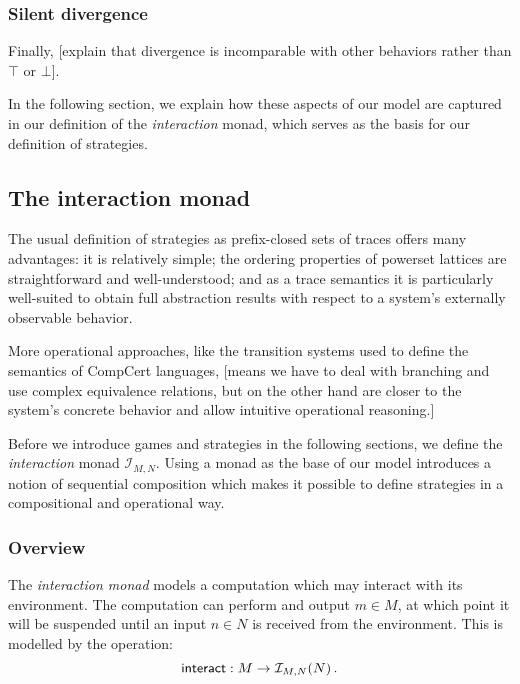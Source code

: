 
\subsubsection{Silent divergence} %

Finally,
[explain that divergence is incomparable with
other behaviors rather than $\top$ or $\bot$].


In the following section,
we explain how these aspects of our model
are captured in our definition of the \emph{interaction} monad,
which serves as the basis for
our definition of strategies.


\subsection{The interaction monad} %

The usual definition of strategies as
prefix-closed sets of traces
offers many advantages:
it is relatively simple;
the ordering properties of powerset lattices
are straightforward and well-understood;
and as a trace semantics
it is particularly well-suited to obtain
full abstraction results
with respect to a system's externally observable behavior.

More operational approaches,
like the transition systems used to define
the semantics of CompCert languages,
[means we have to deal with branching and
use complex equivalence relations,
but on the other hand
are closer to the system's concrete behavior
and allow intuitive operational reasoning.]

Before we introduce games and strategies
in the following sections,
we define the \emph{interaction} monad $\mathcal{I}_{M,N}$.
Using a monad as the base of our model
introduces a notion of sequential composition
which makes it possible to define strategies
in a compositional and operational way.

\subsubsection{Overview} %

The \emph{interaction monad} models
a computation which may interact with its environment.
The computation can perform and output $m \in M$,
at which point it will be suspended
until an input $n \in N$ is received from the environment.
This is modelled by the operation:
\[
     \mathsf{interact}  : M \rightarrow \mathcal{I}_{M,N}(N) \,.
\]

